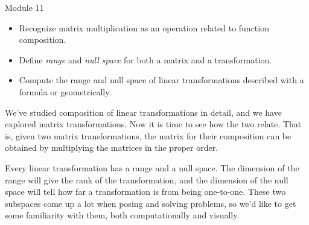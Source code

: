 \documentclass{workbook}
\begin{document}
\begin{lesson}

	Module 11

	\begin{itemize}
		\item Recognize matrix multiplication as an operation related to function composition.
		\item Define \emph{range} and \emph{null space} for both a matrix and a transformation.
		\item Compute the range and null space of linear transformations described
			with a formula or geometrically.
	\end{itemize}

		We've studied composition of linear transformations in detail, and we have explored
		matrix transformations. Now it is time to see how the two relate. That is, given
		two matrix transformations, the matrix for their composition can be obtained by
		multiplying the matrices in the proper order.

		Every linear transformation has a range and a null space. The dimension of the range
		will give the rank of the transformation, and the dimension of the null space
		will tell how far a transformation is from being one-to-one. These two subspaces come up
		a lot when posing and solving problems, so we'd like to get some familiarity with them,
		both computationally
		and visually.


\end{lesson}
\end{document}

